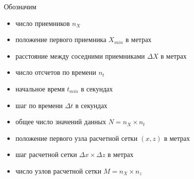 \documentclass{article}
\begin{document}
Обозначим \begin{itemize}
\item число приемников $n_X$                                     
\item положение первого приемника $X_{min}$ в метрах             
\item расстояние между соседними приемниками $\Delta X$ в метрах 
\item число отсчетов по времени $n_t$                            
\item начальное время $t_{min}$ в секундах                       
\item шаг по времени $\Delta t$ в секундах
\item общее число значений данных $N = n_X \times n_t$                   
\item положение первого узла расчетной сетки $(x,z)$ в метрах    
\item шаг расчетной сетки $\Delta x \times \Delta z$ в метрах    
\item число узлов расчетной сетки $M = n_X \times n_z$
\end{itemize}
\end{document}

